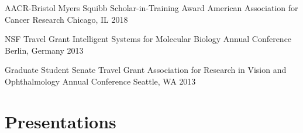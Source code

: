 \documentclass[10pt]{article} %
\begin{document}
\travelAward
{AACR-Bristol Myers Squibb Scholar-in-Training Award}
{American Association for Cancer Research}
{Chicago, IL}
{2018}

\travelAward
{NSF Travel Grant}
{Intelligent Systems for Molecular Biology Annual Conference}
{Berlin, Germany}
{2013}

\travelAward
{Graduate Student Senate Travel Grant}
{Association for Research in Vision and Ophthalmology Annual Conference}
{Seattle, WA}
{2013}


%

%


\section{Presentations}


\end{document}
